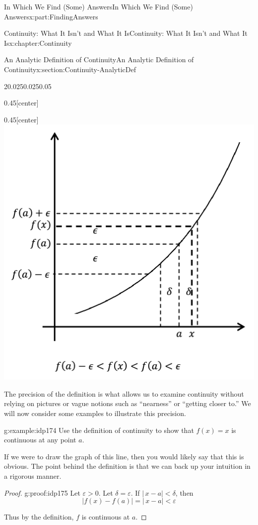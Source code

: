 \documentclass[oneside,10pt,]{book}
\numberwithin{equation}{section}
\newcommand{\eps}{\varepsilon}
\newcommand{\lt}{<}
\begin{document}
\begin{partptx}{In Which We Find (Some) Answers}{}{In Which We Find (Some) Answers}{}{}{x:part:FindingAnswers}
\begin{chapterptx}{Continuity: What It Isn't and What It Is}{}{Continuity: What It Isn't and What It Is}{}{}{x:chapter:Continuity}
\begin{sectionptx}{An Analytic Definition of Continuity}{}{An Analytic Definition of Continuity}{}{}{x:section:Continuity-AnalyticDef}
\begin{sidebyside}{2}{0.025}{0.025}{0.05}
\begin{sbspanel}{0.45}[center]
\end{sbspanel}%
\begin{sbspanel}{0.45}[center]%
\includegraphics[width=\linewidth]{images/Ch5fig3d.png}
\end{sbspanel}%
\end{sidebyside}%
The precision of the definition is what allows us to examine continuity without relying on pictures or vague notions such as ``nearness'' or ``getting closer to.'' We will now consider some examples to illustrate this precision.%
\begin{example}{}{g:example:idp174}%
Use the definition of continuity to show that \(f(x)=x\) is continuous at any point \(a\).%
\end{example}
If we were to draw the graph of this line, then you would likely say that this is obvious.  The point behind the definition is that we can back up your intuition in a rigorous manner.%
\begin{proof}{}{g:proof:idp175}
Let \(\eps>0\). Let \(\delta=\eps\). If \(|\,x-a|\lt \delta\), then%
\begin{equation*}
|f(x)-f(a)|=|\,x-a|\lt \eps
\end{equation*}
%
\par
Thus by the definition, \(f\) is continuous at \(a\).%
\end{proof}

\end{sectionptx}
\end{chapterptx}
\end{partptx}
\end{document}
